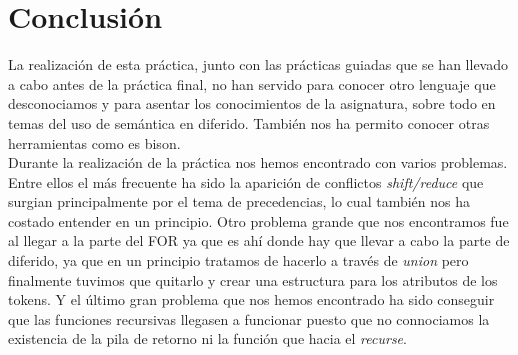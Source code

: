 \documentclass[11pt,spanish]{article}
\begin{document}
	\section{Conclusión}
	La realización de esta práctica, junto con las prácticas guiadas que se han llevado a cabo antes de la práctica final, no han servido para conocer otro lenguaje que desconociamos y para asentar los conocimientos de la asignatura, sobre todo en temas del uso de semántica en diferido. También nos ha permito conocer otras herramientas como es bison.\\
	Durante la realización de la práctica nos hemos encontrado con varios problemas. Entre ellos el más frecuente ha sido la aparición de conflictos \textit {shift/reduce} que surgian principalmente por el tema de precedencias, lo cual también nos ha costado entender en un principio. Otro problema grande que nos encontramos fue al llegar a la parte del FOR ya que es ahí donde hay que llevar a cabo la parte de diferido, ya que en un principio tratamos de hacerlo a través de \textit {union} pero finalmente tuvimos que quitarlo y crear una estructura para los atributos de los tokens. Y el último gran problema que nos hemos encontrado ha sido conseguir que las funciones recursivas llegasen a funcionar puesto que no connociamos la existencia de la pila de retorno ni la función que hacia el \textit {recurse}.
	
\end{document}
